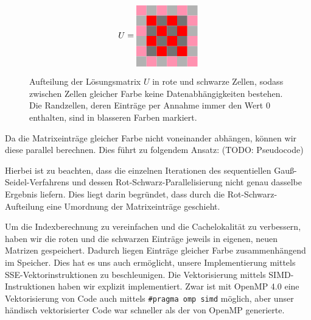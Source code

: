 \documentclass{article}
\begin{document}
\begin{figure}[h!]
\centering
$$U = 
\begin{tabular}{cccccc}
  \cellcolor{rose} & \cellcolor[gray]{0.7} & \cellcolor{rose} & \cellcolor[gray]{0.7} & \cellcolor{rose} & \cellcolor[gray]{0.7}\\
 \cellcolor[gray]{0.7} & \cellcolor{red} & \cellcolor[gray]{0.45} & \cellcolor{red} & \cellcolor[gray]{0.45} & \cellcolor{rose}\\
  \cellcolor{rose} & \cellcolor[gray]{0.45} & \cellcolor{red} & \cellcolor[gray]{0.45} & \cellcolor{red} & \cellcolor[gray]{0.7}\\
 \cellcolor[gray]{0.7} & \cellcolor{red} & \cellcolor[gray]{0.45} & \cellcolor{red} & \cellcolor[gray]{0.45} & \cellcolor{rose} \\
 \cellcolor{rose} & \cellcolor[gray]{0.45} & \cellcolor{red} & \cellcolor[gray]{0.45} & \cellcolor{red} & \cellcolor[gray]{0.7}\\
 \cellcolor[gray]{0.7} & \cellcolor{rose} & \cellcolor[gray]{0.7} & \cellcolor{rose} & \cellcolor[gray]{0.7} & \cellcolor{rose}\\
\end{tabular}
$$
\caption{Aufteilung der Lösungsmatrix $U$ in rote und schwarze Zellen, sodass zwischen Zellen gleicher Farbe keine Datenabhängigkeiten bestehen. Die Randzellen, deren Einträge per Annahme immer den Wert $0$ enthalten, sind in blasseren Farben markiert.}
\label{fig:matrix}
\end{figure}

Da die Matrixeinträge gleicher Farbe nicht voneinander abhängen, können wir diese parallel berechnen. Dies führt zu folgendem Ansatz: (TODO: Pseudocode)

Hierbei ist zu beachten, dass die einzelnen Iterationen des sequentiellen Gauß-Seidel-Verfahrens und dessen Rot-Schwarz-Parallelisierung nicht genau dasselbe Ergebnis liefern. Dies liegt darin begründet, dass durch die Rot-Schwarz-Aufteilung eine Umordnung der Matrixeinträge geschieht.

Um die Indexberechnung zu vereinfachen und die Cachelokalität zu verbessern, haben wir die roten und die schwarzen Einträge jeweils in eigenen, neuen Matrizen gespeichert. Dadurch liegen Einträge gleicher Farbe zusammenhängend im Speicher. Dies hat es uns auch ermöglicht, unsere Implementierung mittels SSE-Vektorinstruktionen zu beschleunigen. Die Vektorisierung mittels SIMD-Instruktionen haben wir explizit implementiert. Zwar ist mit OpenMP 4.0 eine Vektorisierung von Code auch mittels \texttt{\#pragma omp simd} möglich, aber unser händisch vektorisierter Code war schneller als der von OpenMP generierte.
\end{document}
